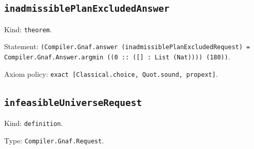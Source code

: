 \documentclass[11pt]{article}
\begin{document}
\subsection*{\texttt{inadmissiblePlanExcludedAnswer}}
\noindent Kind: \texttt{theorem}.\par
\noindent Statement: \texttt{(Compiler.Gnaf.answer (inadmissiblePlanExcludedRequest) = Compiler.Gnaf.Answer.argmin ((0 :: ([] : List (Nat)))) (180))}.\par
\noindent Axiom policy: \texttt{exact [Classical.choice, Quot.sound, propext]}.\par
\subsection*{\texttt{infeasibleUniverseRequest}}
\noindent Kind: \texttt{definition}.\par
\noindent Type: \texttt{Compiler.Gnaf.Request}.\par
\end{document}

